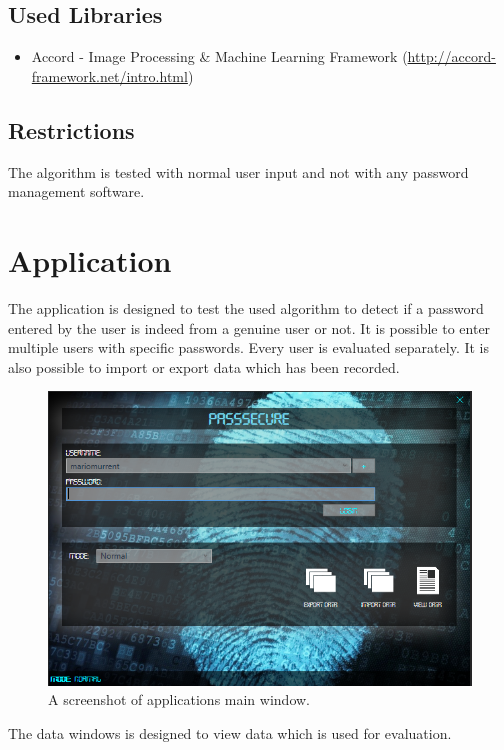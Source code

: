 \documentclass[fleqn,10pt]{SelfArx} %
\begin{document}
\subsection{Used Libraries}
\begin{itemize}
  \item Accord - Image Processing \& Machine Learning Framework (\url{http://accord-framework.net/intro.html})
\end{itemize}

\subsection{Restrictions}
The algorithm is tested with normal user input and not with any password management software.

\section{Application}
The application is designed to test the used algorithm to detect if a password entered by the user is indeed from a genuine user or not. It is possible to enter multiple users with specific passwords. Every user is evaluated separately. It is also possible to import or export data which has been recorded.
\begin{figure}[!htb]
\includegraphics[scale=0.5]{application}
 \caption{A screenshot of applications main window.}
\end{figure}
The data windows is designed to view data which is used for evaluation.
\end{document}
